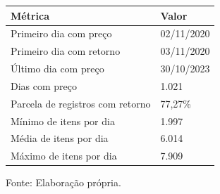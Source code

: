 \begingroup
\setlength{}
\setlength{}
\fontsize{12.0pt}{14.4pt}\selectfont

\setlength{\LTpost}{0mm}
\begin{longtable}{@{\extracolsep{\fill}}ll}

\toprule
\textbf{Métrica} & \textbf{Valor} \\ 
\midrule\addlinespace[2.5pt]
Primeiro dia com preço & 02/11/2020 \\
Primeiro dia com retorno & 03/11/2020 \\
Último dia com preço & 30/10/2023 \\
Dias com preço & 1.021 \\
Parcela de registros com retorno & 77,27\% \\
Mínimo de itens por dia & 1.997 \\
Média de itens por dia & 6.014 \\
Máximo de itens por dia & 7.909 \\
\bottomrule
\end{longtable}
\begin{minipage}{\linewidth}
Fonte: Elaboração própria.\\
\end{minipage}
\endgroup
